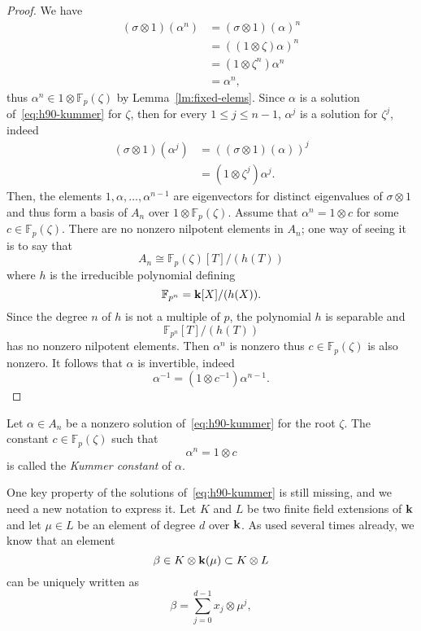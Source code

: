  \begin{proof}
  We have
  \begin{align*}
    (\sigma\otimes1)(\alpha^n) &= (\sigma\otimes1)(\alpha)^n\\
    &= ((1\otimes\zeta)\alpha)^n\\
    &= (1\otimes\zeta^n)\alpha^n\\
    &= \alpha^n,
  \end{align*}
  thus $\alpha^n\in1\otimes\mathbb{F}_p(\zeta)$ by Lemma~\ref{lm:fixed-elems}.
  Since $\alpha$ is a solution of~\eqref{eq:h90-kummer} for $\zeta$, then
  for every $1\leq j\leq n-1$, $\alpha^j$ is a solution for $\zeta^j$, indeed
  \begin{align*}
    (\sigma\otimes 1)(\alpha^j) &= ( (\sigma\otimes1)(\alpha))^j\\
    &= (1\otimes\zeta^j)\alpha^j.
  \end{align*}
  Then, the elements $1, \alpha, \dots, \alpha^{n-1}$ are eigenvectors for
  distinct eigenvalues of $\sigma\otimes1$ and thus form a basis of $A_n$ over
  $1\otimes \mathbb{F}_{p}(\zeta)$. Assume that $\alpha^n=1\otimes c$ for some
  $c\in\mathbb{F}_{p}(\zeta)$. There are no nonzero nilpotent elements in $A_n$;
  one way of seeing it is to say that
  \[
    A_n \cong \mathbb{F}_{p}(\zeta)[T]/(h(T))
  \]
  where $h$ is the irreducible polynomial defining
  \[
    \mathbb{F}_{p^n} = \mathbf{k}[X]/(h(X)).
  \]
  Since the degree $n$ of
  $h$ is not a multiple of $p$, the polynomial $h$ is separable and 
  \[
    \mathbb{F}_{p^n}[T]/(h(T))
  \]
  has no nonzero nilpotent elements. Then $\alpha^n$ is nonzero thus
  $c\in\mathbb{F}_p(\zeta)$ is also nonzero. It follows that $\alpha$ is
  invertible, indeed
  \[
    \alpha^{-1} = (1\otimes c^{-1})\alpha^{n-1}.
  \]
 \end{proof}
 \begin{defi}
   Let $\alpha\in A_n$ be a nonzero solution of~\eqref{eq:h90-kummer} for the
   root $\zeta$. The constant $c\in\mathbb{F}_p(\zeta)$ such that
   \[
     \alpha^n = 1\otimes c
   \]
   is called the \emph{Kummer constant} of $\alpha$.
 \end{defi}
 One key property of the solutions of~\eqref{eq:h90-kummer} is still missing,
 and we need a new notation to express it. Let $K$ and $L$ be two finite field
 extensions of $\mathbf{k}$ and let $\mu\in L$ be an element of degree $d$ over $\mathbf{k}$. As
 used several times already, we know that an element 
 \[
   \beta\in K\otimes \mathbf{k}(\mu)\subset K\otimes L 
 \]
   can be uniquely written as
 \[
   \beta=\sum_{j=0}^{d-1}x_j\otimes\mu^j,
 \]
